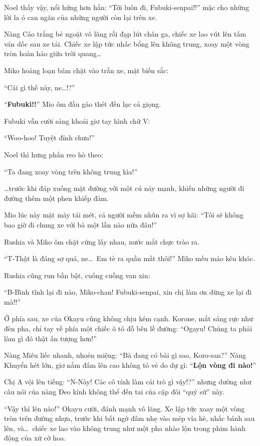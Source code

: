 \documentclass[../main.tex]{subfiles}
\begin{document}
Noel thấy vậy, nổi hứng hơn hẳn: ``Tới luôn đi, Fubuki-senpai!!'' mặc cho những lời la ó can ngăn của những người còn lại trên xe.

Nàng Cáo trắng bẻ ngoặt vô lăng rồi đạp lút chân ga, chiếc xe lao vút lên tấm ván dốc sau xe tải. Chiếc xe lập tức nhấc bổng lên không trung, xoay một vòng tròn hoàn hảo giữa trời quang\dots

Miko hoảng loạn bám chặt vào trần xe, mặt biến sắc:

``Cái gì thế này, ne\dots!?''

``\textbf{Fubuki!!}'' Mio ôm đầu gào thét đến lạc cả giọng.

Fubuki vẫn cười sảng khoái giơ tay hình chữ V:

``Woo-hoo! Tuyệt đỉnh chưa!''

Noel thì hưng phấn reo hò theo:

``Ta đang xoay vòng trên không trung kìa!''

\dots trước khi đáp xuống mặt đường với một cú nảy mạnh, khiến những người đi đường thêm một phen khiếp đảm.

Mio lúc này mặt mày tái mét, cả người mềm nhũn ra vì sợ hãi: ``Tôi sẽ không bao giờ đi chung xe với bà một lần nào nữa đâu!''

Rushia và Miko ôm chặt cứng lấy nhau, nước mắt chực trào ra.

``T-Thật là đáng sợ quá, ne\dots\ Em tè ra quần mất thôi!'' Miko mếu máo kêu khóc.

Rushia cũng run bần bật, cuống cuồng van xin:

``B-Bình tĩnh lại đi nào, Miko-chan! Fubuki-senpai, xin chị làm ơn dừng xe lại đi mà!!''

Ở phía sau, xe của Okayu cũng không chịu kém cạnh. Korone, mắt sáng rực như đèn pha, chỉ tay về phía một chiếc ô tô đỗ bên lề đường: ``Ogayu! Chúng ta phải làm gì đó thật ấn tượng hơn!''

Nàng Miêu liếc nhanh, nhoẻn miệng: ``Bà đang có bài gì sao, Koro-san?'' Nàng Khuyển hét lớn, giơ nắm đấm lên cao không tỏ vẻ do dự gì: ``\textbf{Lộn vòng đi nào!}''

Chị A vội lên tiếng: ``N-Này! Các cô tính làm cái trò gì vậy!?'' nhưng dường như câu nói của nàng Đeo kính không thể đến tai của cặp đôi ``quỷ sứ'' này.

``Vậy thì lên nào!'' Okayu cười, đánh mạnh vô lăng. Xe lập tức xoay một vòng tròn trên đường nhựa, trước khi bất ngờ đâm nhẹ vào mép vỉa hè, nhấc bánh sau lên, và\dots\ chiếc xe lao vào không trung như một pha nhào lộn trong phim hành động của xứ cờ hoa.
\end{document}
